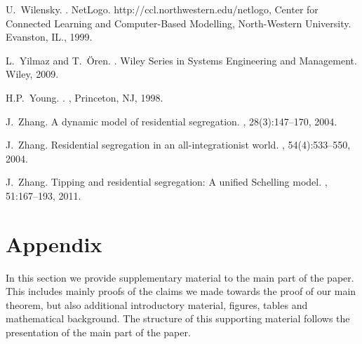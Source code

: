 \documentclass[11pt]{article}
\theoremstyle{plain}
\numberwithin{equation}{subsection}
\begin{document}
\begin{thebibliography}{CMGP13}
U.~Wilensky.
.
\newblock NetLogo. http://ccl.northwestern.edu/netlogo, Center for Connected
  Learning and Computer-Based Modelling, North-Western University. Evanston,
  IL., 1999.

L.~Yilmaz and T.~{\"O}ren.
.
\newblock Wiley Series in Systems Engineering and Management. Wiley, 2009.

H.P.\ Young.
.
, Princeton, NJ, 1998.

J.\ Zhang.
\newblock A dynamic model of residential segregation.
, 28(3):147--170, 2004.

J.\ Zhang.
\newblock Residential segregation in an all-integrationist world.
, 54(4):533--550,
  2004.

J.\ Zhang.
\newblock Tipping and residential segregation: A unified {S}chelling model.
, 51:167--193, 2011.

\end{thebibliography}

\newpage


\section{Appendix}\label{se:prelim}
In this section we provide supplementary material to the main part of the paper. 
This includes mainly proofs of the claims we made towards the proof of our main theorem, but also
additional introductory material, figures, tables and mathematical background.
The structure of this supporting material follows the presentation of the main part of the paper.
\end{document}
